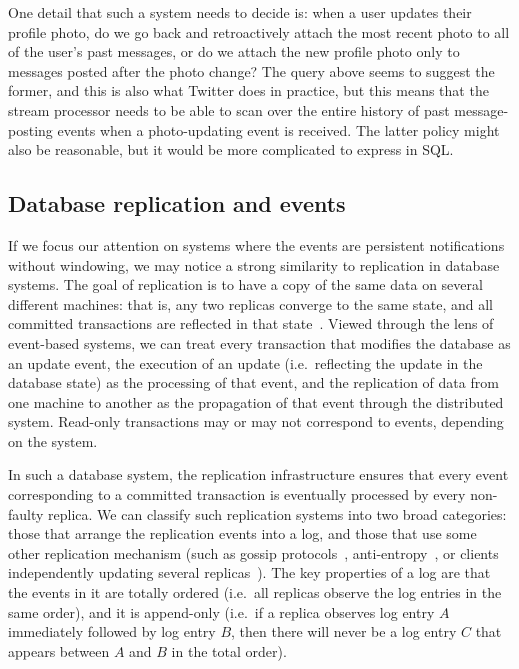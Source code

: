 \documentclass[sigconf]{acmart}
\begin{document}
One detail that such a system needs to decide is: when a user updates their profile photo, do we go back and retroactively attach the most recent photo to all of the user's past messages, or do we attach the new profile photo only to messages posted after the photo change?
The query above seems to suggest the former, and this is also what Twitter does in practice, but this means that the stream processor needs to be able to scan over the entire history of past message-posting events when a photo-updating event is received.
The latter policy might also be reasonable, but it would be more complicated to express in SQL.

\subsection{Database replication and events}\label{sec:replication}

If we focus our attention on systems where the events are persistent notifications without windowing, we may notice a strong similarity to replication in database systems.
The goal of replication is to have a copy of the same data on several different machines: that is, any two replicas converge to the same state, and all committed transactions are reflected in that state~\cite{CharronBost:2010}.
Viewed through the lens of event-based systems, we can treat every transaction that modifies the database as an update event, the execution of an update (i.e.\ reflecting the update in the database state) as the processing of that event, and the replication of data from one machine to another as the propagation of that event through the distributed system.
Read-only transactions may or may not correspond to events, depending on the system.

In such a database system, the replication infrastructure ensures that every event corresponding to a committed transaction is eventually processed by every non-faulty replica.
We can classify such replication systems into two broad categories: those that arrange the replication events into a log, and those that use some other replication mechanism (such as gossip protocols~\cite{Leitao:2007}, anti-entropy~\cite{DeCandia:2007}, or clients independently updating several replicas~\cite{Attiya:1995}).
The key properties of a log are that the events in it are totally ordered (i.e.\ all replicas observe the log entries in the same order), and it is append-only (i.e.\ if a replica observes log entry $A$ immediately followed by log entry $B$, then there will never be a log entry $C$ that appears between $A$ and $B$ in the total order).
\end{document}
